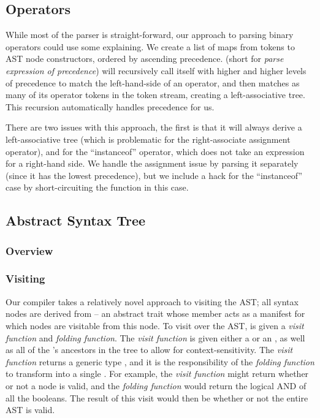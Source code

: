 \documentclass{article}
\begin{document}
\subsection{Operators}

While most of the parser is straight-forward, our approach to parsing binary operators could use some explaining. We
create a list of maps from tokens to AST node constructors, ordered by ascending precedence.  (short
for \emph{parse expression of precedence}) will recursively call itself with higher and higher levels of precedence to
match the left-hand-side of an operator, and then matches as many of its operator tokens in the token stream, creating a
left-associative tree. This recursion automatically handles precedence for us.

There are two issues with this approach, the first is that it will always derive a left-associative tree (which is
problematic for the right-associate assignment operator), and for the ``instanceof'' operator, which does not take an
expression for a right-hand side. We handle the assignment issue by parsing it separately (since it has the lowest
precedence), but we include a hack for the ``instanceof'' case by short-circuiting the function in this case.




\subsection{Abstract Syntax Tree}

\subsubsection{Overview}

\subsubsection{Visiting}
\label{sec:visiting}

Our compiler takes a relatively novel approach to visiting the AST; all syntax nodes are derived from 
-- an abstract trait whose \value{children} member acts as a manifest for which nodes are visitable from this node. To
visit over the AST,  is given a \textit{visit function} and \textit{folding function}. The \textit{visit
function} is given either a \value{Before(Node)} or an \value{After(Node)}, as well as all of the \value{Node}'s
ancestors in the tree to allow for context-sensitivity. The \textit{visit function} returns a generic type ,
and it is the responsibility of the \textit{folding function} to transform  into a single . For
example, the \textit{visit function} might return whether or not a node is valid, and the \textit{folding function}
would return the logical AND of all the booleans. The result of this visit would then be whether or not the entire AST
is valid.
\end{document}

